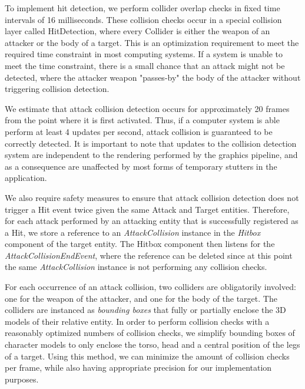 

To implement hit detection, we perform collider overlap checks in fixed time intervals of 16 milliseconds. These collision checks occur in a special collision layer called HitDetection, where every Collider is either the weapon of an attacker or the body of a target. This is an optimization requirement to meet the required time constraint in most computing systems. If a system is unable to meet the time constraint, there is a small chance that an attack might not be detected, where the attacker weapon "passes-by" the body of the attacker without triggering collision detection.

We estimate that attack collision detection occurs for approximately 20 frames from the point where it is first activated. Thus, if a computer system is able perform at least 4 updates per second, attack collision is guaranteed to be correctly detected. It is important to note that updates to the collision detection system are independent to the rendering performed by the graphics pipeline, and as a consequence are unaffected by most forms of temporary stutters in the application.

We also require safety measures to ensure that attack collision detection does not trigger a Hit event twice given the same Attack and Target entities. Therefore, for each attack performed by an attacking entity that is successfully registered as a Hit, we store a reference to an \emph{AttackCollision} instance in the \emph{Hitbox} component of the target entity. The Hitbox component then listens for the \emph{AttackCollisionEndEvent}, where the reference can be deleted since at this point the same \emph{AttackCollision} instance is not performing any collision checks.

For each occurrence of an attack collision, two colliders are obligatorily involved: one for the weapon of the attacker, and one for the body of the target. The colliders are instanced as \emph{bounding boxes} that fully or partially enclose the 3D models of their relative entity. In order to perform collision checks with a reasonably optimized numbers of collision checks, we simplify bounding boxes of character models to only enclose the torso, head and a central position of the legs of a target. Using this method, we can minimize the amount of collision checks per frame, while also having appropriate precision for our implementation purposes.

